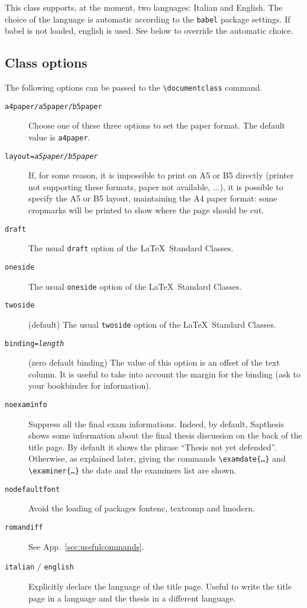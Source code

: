 \documentclass[a5paper,11pt]{article}
\newcommand{\bs}{\textbackslash}
\begin{document}
This class supports, at the moment, two languages: Italian and English. The choice of the language is automatic according to the \texttt{babel} package settings. If babel is not loaded, english is used. See below to override the automatic choice. 

\subsection{Class options}
\label{class_options}
The following options can be passed to the \texttt{\bs documentclass} command.

\begin{description}

\item[\texttt{a4paper/a5paper/b5paper}] Choose one of these three options to set the paper format. The default value is \texttt{a4paper}.
\item[\texttt{layout=\textsl{a5paper/b5paper}}] If, for some reason, it is impossible to print on A5 or B5 directly (printer not supporting these formats, paper not available, ...), it is possible to specify the A5 or B5 layout, maintaining the A4 paper format: some cropmarks will be printed to show where the page should be cut.
\item[\texttt{draft}] The usual \texttt{draft} option of the \LaTeX\ Standard Classes.
\item[\texttt{oneside}] The usual \texttt{oneside} option of the \LaTeX\ Standard Classes.
\item[\texttt{twoside}] (default) The usual \texttt{twoside} option of the \LaTeX\ Standard Classes.

\item[\texttt{binding=\textsl{length}}] (zero default binding)
The value of this option is an offset of the text column.
It is useful to take into account the margin for the binding (ask to your bookbinder for information).
\item[\texttt{noexaminfo}] Suppress all the final exam informations. Indeed, by default, \textsf{Sapthesis} shows some information about the final thesis discussion on the back of the title page. By default it shows the phrase ``Thesis not yet defended''. Otherwise, as explained later, giving the commands 
\texttt{\bs examdate\{\dots\}} and \texttt{\bs examiner\{\dots\}} the date and
the examiners list are shown.
\item[\texttt{nodefaultfont}] Avoid the loading of packages \textsf{fontenc}, \textsf{textcomp} and \textsf{lmodern}.
\item[\texttt{romandiff}] See App.~\ref{sec:usefulcommands}.
\item[\texttt{italian} / \texttt{english}] Explicitly declare the language of 
the title page. Useful to write the title page in a language 
and the thesis in a different language.
\end{description}
\end{document}
